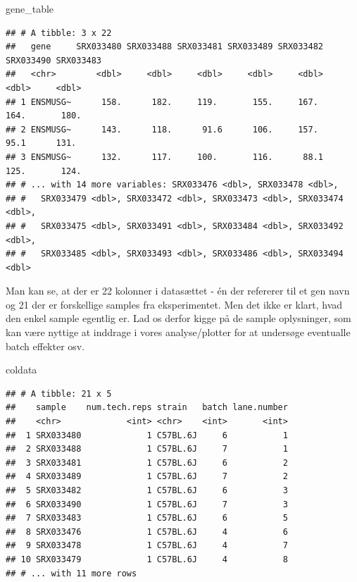 \documentclass[
]{book}
\newenvironment{Shaded}{\begin{snugshade}}{\end{snugshade}}
\newcommand{\NormalTok}[1]{#1}
\begin{document}
\begin{Shaded}
\begin{Highlighting}[]
\NormalTok{gene\_table}
\end{Highlighting}
\end{Shaded}

\begin{verbatim}
## # A tibble: 3 x 22
##   gene     SRX033480 SRX033488 SRX033481 SRX033489 SRX033482 SRX033490 SRX033483
##   <chr>        <dbl>     <dbl>     <dbl>     <dbl>     <dbl>     <dbl>     <dbl>
## 1 ENSMUSG~      158.      182.     119.       155.     167.      164.       180.
## 2 ENSMUSG~      143.      118.      91.6      106.     157.       95.1      131.
## 3 ENSMUSG~      132.      117.     100.       116.      88.1     125.       124.
## # ... with 14 more variables: SRX033476 <dbl>, SRX033478 <dbl>,
## #   SRX033479 <dbl>, SRX033472 <dbl>, SRX033473 <dbl>, SRX033474 <dbl>,
## #   SRX033475 <dbl>, SRX033491 <dbl>, SRX033484 <dbl>, SRX033492 <dbl>,
## #   SRX033485 <dbl>, SRX033493 <dbl>, SRX033486 <dbl>, SRX033494 <dbl>
\end{verbatim}

Man kan se, at der er 22 kolonner i datasættet - én der refererer til et gen navn og 21 der er forskellige samples fra eksperimentet. Men det ikke er klart, hvad den enkel sample egentlig er. Lad os derfor kigge på de sample oplysninger, som kan være nyttige at inddrage i vores analyse/plotter for at undersøge eventualle batch effekter osv.

\begin{Shaded}
\begin{Highlighting}[]
\NormalTok{coldata}
\end{Highlighting}
\end{Shaded}

\begin{verbatim}
## # A tibble: 21 x 5
##    sample    num.tech.reps strain   batch lane.number
##    <chr>             <int> <chr>    <int>       <int>
##  1 SRX033480             1 C57BL.6J     6           1
##  2 SRX033488             1 C57BL.6J     7           1
##  3 SRX033481             1 C57BL.6J     6           2
##  4 SRX033489             1 C57BL.6J     7           2
##  5 SRX033482             1 C57BL.6J     6           3
##  6 SRX033490             1 C57BL.6J     7           3
##  7 SRX033483             1 C57BL.6J     6           5
##  8 SRX033476             1 C57BL.6J     4           6
##  9 SRX033478             1 C57BL.6J     4           7
## 10 SRX033479             1 C57BL.6J     4           8
## # ... with 11 more rows
\end{verbatim}
\end{document}
